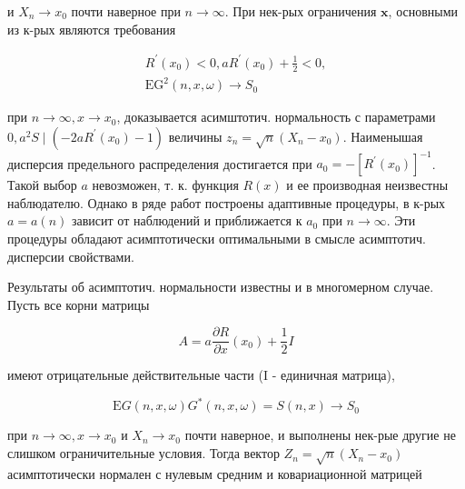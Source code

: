 \documentclass[10pt]{article}
\begin{document}
и $X_{n} \rightarrow x_{0}$ почти наверное при $n \rightarrow \infty$. При нек-рых ограничения $\mathbf{x}$, основными из к-рых являются требования



\[

\begin{gathered}

R^{\prime}\left(x_{0}\right)<0, a R^{\prime}\left(x_{0}\right)+\frac{1}{2}<0, \\

\mathrm{EG}^{2}(n, x, \omega) \longrightarrow S_{0}

\end{gathered}

\]



при $n \rightarrow \infty, x \rightarrow x_{0}$, доказывается асимштотич. нормальность с параметрами $0, a^{2} S \mid\left(-2 a R^{\prime}\left(x_{0}\right)-1\right)$ величины $z_{n}=\sqrt{n}\left(X_{n}-x_{0}\right)$. Наименышая дисперсия предельного распределения достигается при $a_{0}=-\left[R^{\prime}\left(x_{0}\right)\right]^{-1}$. Такой выбор $a$ невозможен, т. к. функция $R(x)$ и ее производная неизвестны наблюдателю. Однако в ряде работ построены адаптивные процедуры, в к-рых $a=a(n)$ зависит от наблюдений и приближается к $a_{0}$ при $n \rightarrow \infty$. Эти процедуры обладают асимптотически оптимальными в смысле асимптотич. дисперсии свойствами.



Результаты об асимптотич. нормальности известны и в многомерном случае. Пусть все корни матрицы



\[

A=a \frac{\partial R}{\partial x}\left(x_{0}\right)+\frac{1}{2} I

\]



имеют отрицательные действительные части (I - единичная матрица),



\[

\mathrm{E} G(n, x, \omega) G^{*}(n, x, \omega)=S(n, x) \longrightarrow S_{0}

\]



при $n \rightarrow \infty, x \rightarrow x_{0}$ и $X_{n} \rightarrow x_{0}$ почти наверное, и выполнены нек-рые другие не слишком ограничительные условия. Тогда вектор $Z_{n}=\sqrt{n}\left(X_{n}-x_{0}\right)$ асимптотически нормален с нулевым средним и ковариационной матрицей
\end{document}
